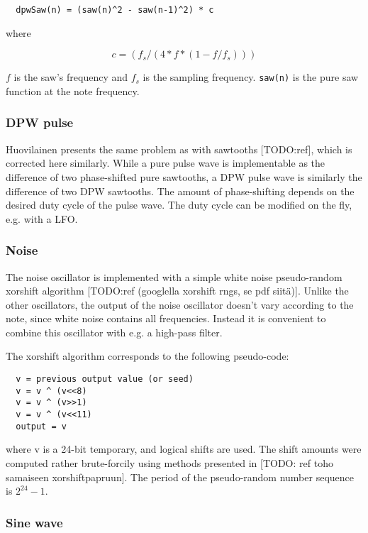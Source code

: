 \documentclass[10pt,a4paper,oneside]{article}
\begin{document}
\begin{verbatim}
  dpwSaw(n) = (saw(n)^2 - saw(n-1)^2) * c
\end{verbatim}

where

\[
  c = (f_s / (4*f * (1 - f/f_s)))
\]

$f$ is the saw's frequency and $f_s$ is the sampling frequency. \verb|saw(n)| is the pure saw function at the note frequency.

\subsubsection{DPW pulse}

Huovilainen presents the same problem as with sawtooths [TODO:ref], which is corrected here similarly. While a pure pulse wave is implementable as the difference of two phase-shifted pure sawtooths, a DPW pulse wave is similarly the difference of two DPW sawtooths. The amount of phase-shifting depends on the desired duty cycle of the pulse wave. The duty cycle can be modified on the fly, e.g. with a LFO.

\subsubsection{Noise}

The noise oscillator is implemented with a simple white noise pseudo-random xorshift algorithm [TODO:ref (googlella xorshift rngs, se pdf siitä)]. Unlike the other oscillators, the output of the noise oscillator doesn't vary according to the note, since white noise contains all frequencies. Instead it is convenient to combine this oscillator with e.g. a high-pass filter.

The xorshift algorithm corresponds to the following pseudo-code:

\begin{verbatim}
  v = previous output value (or seed)
  v = v ^ (v<<8)
  v = v ^ (v>>1)
  v = v ^ (v<<11)
  output = v
\end{verbatim}

where v is a 24-bit temporary, and logical shifts are used. The shift amounts were computed rather brute-forcily using methods presented in [TODO: ref toho samaiseen xorshiftpapruun]. The period of the pseudo-random number sequence is $2^{24} - 1$.

\subsubsection{Sine wave}
\end{document}
